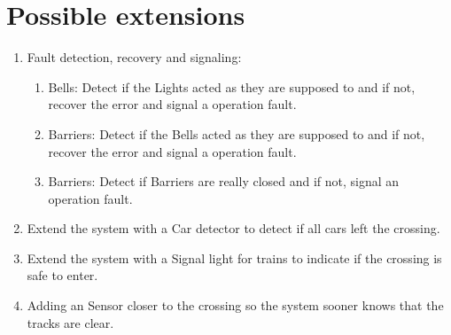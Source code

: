 \documentclass[final]{report}
\begin{document}
\section{Possible extensions}
	\begin{enumerate}
	\item Fault detection, recovery and signaling:
		\begin{enumerate}
			\item Bells: Detect if the Lights acted as they are supposed to and if not, recover the error and signal a operation fault.
			\item Barriers: Detect if the Bells acted as they are supposed to and if not, recover the error and signal a operation fault.
			\item Barriers: Detect if Barriers are really closed and if not, signal an operation fault.
		\end{enumerate}

	\item Extend the system with a Car detector to detect if all cars left the crossing.
	\item Extend the system with a Signal light for trains to indicate if the crossing is safe to enter.
	\item Adding an Sensor closer to the crossing so the system sooner knows that the tracks are clear.
	\end{enumerate}
\end{document}
